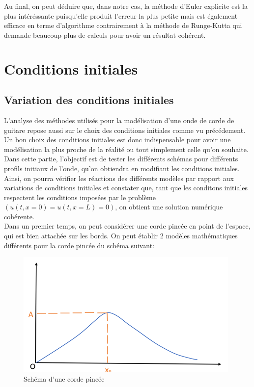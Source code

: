 Au final, on peut déduire que, dans notre cas, la méthode d'Euler explicite est la plus intéréssante puisqu'elle produit l'erreur la plus petite mais est également efficace en terme d'algorithme contrairement à la méthode de Runge-Kutta qui demande beaucoup plus de calculs pour avoir un résultat cohérent.



\section{Conditions initiales}

\subsection{Variation des conditions initiales}


L'analyse des méthodes utilisés pour la modélisation d'une onde  de corde de guitare repose aussi sur le choix des conditions initiales comme vu précédement.
Un bon choix des conditions initiales est donc indispensable pour avoir une modélisation la plus proche de la réalité ou tout simplement celle qu'on souhaite.\\


Dans cette partie, l'objectif est de tester les différents schémas pour différents profils initiaux de l'onde, qu'on obtiendra en modifiant les conditions initiales. \\

Ainsi, on pourra vérifier les réactions des différents modèles par rapport aux variations de conditions initiales et constater que, tant que les conditons initiales respectent les conditions imposées par le problème $(u(t,x=0)=u(t,x=L)=0)$, on obtient une solution numérique cohérente.\\

Dans un premier temps, on peut considérer une corde pincée en point de l'espace, qui est bien attachée sur les bords.
On peut établir 2 modèles mathématiques différents pour la corde pincée du schéma suivant:

\begin{figure}[H]
\centering
\includegraphics[scale=1]{image2.png}
\caption{Schéma d'une corde pincée}
\label{fig1}
\end{figure}



